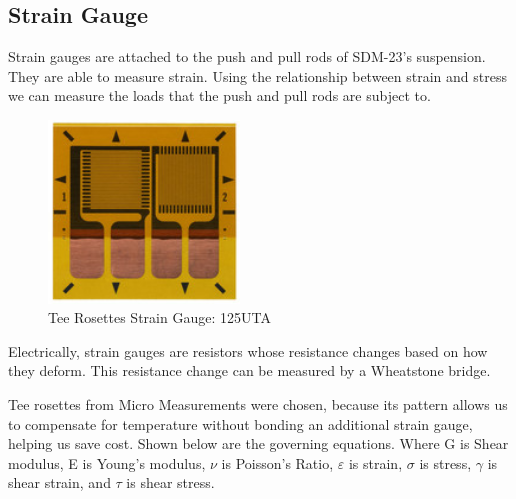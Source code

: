 \subsection{Strain Gauge}
Strain gauges are attached to the push and pull rods of SDM-23's suspension.
They are able to measure strain. Using the relationship between strain and stress we can measure the loads that the push and pull rods are subject to.
\begin{figure}[H]
        \centering
        \includegraphics[width=2in]{images/Strain Gauge/125UTA.png}
        \caption{Tee Rosettes Strain Gauge: 125UTA}
        \label{fig:Tee Rosette Strain Gauge: 125UTA}
\end{figure}

Electrically, strain gauges are resistors whose resistance changes based on how they deform.
This resistance change can be measured by a Wheatstone bridge.
\vspace{1em}

Tee rosettes from Micro Measurements were chosen, because its pattern allows us to compensate for temperature without bonding an additional strain gauge, helping us save cost. Shown below are the governing equations. Where G is Shear modulus, E is Young's modulus, $\nu$ is Poisson's Ratio, $\varepsilon$ is strain, $\sigma$ is stress, $\gamma$ is shear strain, and $\tau$ is shear stress. 
\vspace{1em}

